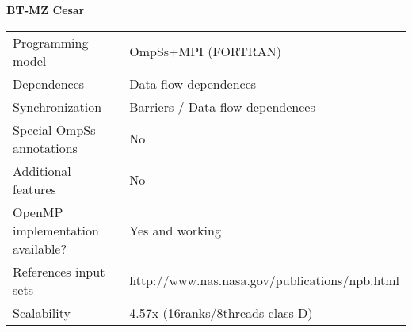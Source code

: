 
\section*{}
\label{nas_bt-mz_cesar}

\centering
\Huge
\textbf{BT-MZ Cesar}

\begin{table}[h!]
  \large
  \centering
  \begin{tabular}{|l|l|}
    \hline
    Programming model                &  OmpSs+MPI (FORTRAN)\\
    Dependences                      &  Data-flow dependences\\
    Synchronization                  &  Barriers / Data-flow dependences\\
    Special OmpSs annotations        &  No\\
    Additional features              &  No\\
    OpenMP implementation available? &  Yes and working\\
    References input sets            &  http://www.nas.nasa.gov/publications/npb.html\\
    Scalability                      &  4.57x (16ranks/8threads class D)\\
    \hline
  \end{tabular}
\end{table}

\newpage
